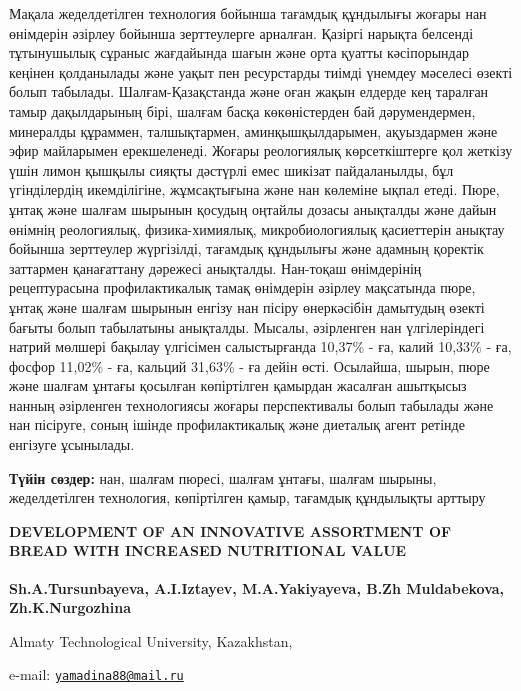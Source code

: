 Мақала жеделдетілген технология бойынша тағамдық құндылығы жоғары нан
өнімдерін әзірлеу бойынша зерттеулерге арналған. Қазіргі нарықта
белсенді тұтынушылық сұраныс жағдайында шағын және орта қуатты
кәсіпорындар кеңінен қолданылады және уақыт пен ресурстарды тиімді
үнемдеу мәселесі өзекті болып табылады. Шалғам-Қазақстанда және оған
жақын елдерде кең таралған тамыр дақылдарының бірі, шалғам басқа
көкөністерден бай дәрумендермен, минералды құраммен, талшықтармен,
аминқышқылдарымен, ақуыздармен және эфир майларымен ерекшеленеді. Жоғары
реологиялық көрсеткіштерге қол жеткізу үшін лимон қышқылы сияқты
дәстүрлі емес шикізат пайдаланылды, бұл үгінділердің икемділігіне,
жұмсақтығына және нан көлеміне ықпал етеді. Пюре, ұнтақ және шалғам
шырынын қосудың оңтайлы дозасы анықталды және дайын өнімнің реологиялық,
физика-химиялық, микробиологиялық қасиеттерін анықтау бойынша зерттеулер
жүргізілді, тағамдық құндылығы және адамның қоректік заттармен
қанағаттану дәрежесі анықталды. Нан-тоқаш өнімдерінің рецептурасына
профилактикалық тамақ өнімдерін әзірлеу мақсатында пюре, ұнтақ және
шалғам шырынын енгізу нан пісіру өнеркәсібін дамытудың өзекті бағыты
болып табылатыны анықталды. Мысалы, әзірленген нан үлгілеріндегі натрий
мөлшері бақылау үлгісімен салыстырғанда 10,37\% - ға, калий 10,33\% -
ға, фосфор 11,02\% - ға, кальций 31,63\% - ға дейін өсті. Осылайша,
шырын, пюре және шалғам ұнтағы қосылған көпіртілген қамырдан жасалған
ашытқысыз нанның әзірленген технологиясы жоғары перспективалы болып
табылады және нан пісіруге, соның ішінде профилактикалық және диеталық
агент ретінде енгізуге ұсынылады.

{\bfseries Түйін сөздер:} нан, шалғам пюресі, шалғам ұнтағы, шалғам шырыны,
жеделдетілген технология, көпіртілген қамыр, тағамдық құндылықты арттыру

{\bfseries DEVELOPMENT OF AN INNOVATIVE ASSORTMENT OF BREAD WITH INCREASED
NUTRITIONAL VALUE}

{\bfseries Sh.A.Tursunbayeva, A.I.Iztayev,
M.A.Yakiyayeva\textsuperscript{\envelope }, B.Zh Muldabekova, Zh.K.Nurgozhina}

Almaty Technological University, Kazakhstan,

e-mail: \href{mailto:yamadina88@mail.ru}{\nolinkurl{yamadina88@mail.ru}}

